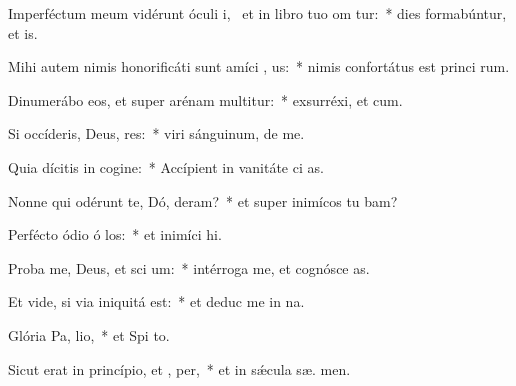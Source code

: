 \item Imperféctum meum vidérunt óculi i,~\pscross{} et in libro tuo om tur:~* dies formabúntur, et   is.
\item Mihi autem nimis honorificáti sunt amíci , us:~* nimis confortátus est princi rum.
\item Dinumerábo eos, et super arénam multitur:~* exsurréxi, et   cum.
\item Si occíderis, Deus, res:~* viri sánguinum, de  me.
\item Quia dícitis in cogine:~* Accípient in vanitáte ci as.
\item Nonne qui odérunt te, Dó, deram?~* et super inimícos tu bam?
\item Perfécto ódio ó los:~* et inimíci   hi.
\item Proba me, Deus, et sci  um:~* intérroga me, et cognósce  as.
\item Et vide, si via iniquitá   est:~* et deduc me in  na.
\item Glória Pa,  lio,~* et Spi to.
\item Sicut erat in princípio, et ,  per,~* et in sǽcula sæ. men.
